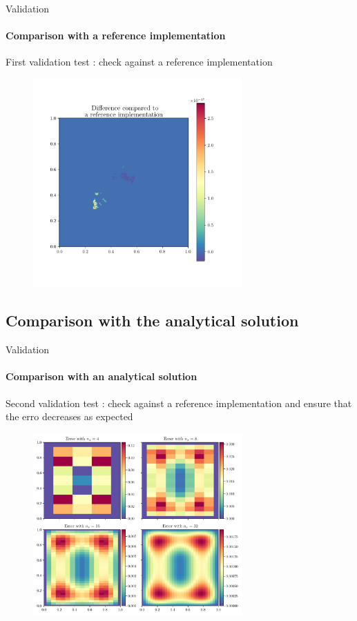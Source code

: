 \documentclass{beamer}
\begin{document}

\begin{frame}{Validation}
    \framesubtitle{Comparison with a reference implementation}
    First validation test : check against a reference implementation
    \begin{figure}
        \centering
        \includegraphics[height=8cm]{Figures/solcomp.pdf}
    \end{figure}
\end{frame}


\subsection{Comparison with the analytical solution}
\begin{frame}{Validation}
    \framesubtitle{Comparison with an analytical solution}
    Second validation test : check against a reference implementation and ensure that the erro decreases as expected

    \begin{figure}
        \centering
        \includegraphics[height=7cm]{Figures/plotconverge.pdf}
    \end{figure}
\end{frame}
\end{document}
